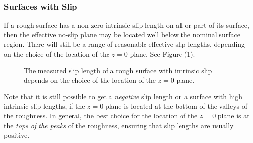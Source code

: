 \documentclass[12pt, a4paper, twoside, openright]{book}
\begin{document}
\clearpage
\subsubsection{ Surfaces with Slip}

If a rough surface has a non-zero intrinsic slip length on all or part of its surface,  then the effective no-slip plane may be located well below the nominal surface region.  There will still be a range of reasonable effective slip lengths, depending on the choice of the location of the $z=0$ plane.  See Figure (\ref{roughslip}).  

\begin{figure}[ht]
\centering
{}
\caption{The measured slip length of a rough surface with intrinsic slip depends on the choice of the location of the $z=0$ plane.}\label{roughslip}
\end{figure}

Note that it is still possible to get a \emph{negative} slip length on a surface with high intrinsic slip lengths, if the $z=0$ plane is located at the bottom of the valleys of the roughness.  In general, the best choice for the location of the $z=0$ plane is at the \emph{tops of the peaks} of the roughness, ensuring that slip lengths are usually positive. 
\end{document}
